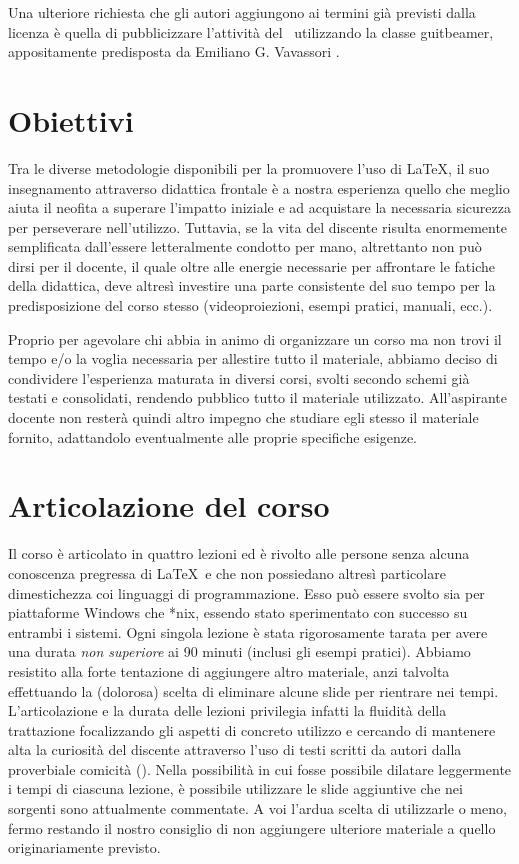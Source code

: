 \documentclass[a4paper,12pt]{article}
\begin{document}
Una ulteriore richiesta che gli autori aggiungono ai termini gi\`a
previsti dalla licenza \`e quella di pubblicizzare l'attivit\`a del
\GuITtext\ utilizzando la classe \textsf{guitbeamer}, appositamente
predisposta da Emiliano G. Vavassori \cite{EVG}.
\section{Obiettivi}
Tra le diverse metodologie disponibili per la promuovere l'uso di
\LaTeX, il suo insegnamento attraverso didattica frontale \`e a nostra
esperienza quello che meglio aiuta il neofita a superare l'impatto
iniziale e ad acquistare la necessaria sicurezza per perseverare
nell'utilizzo. Tuttavia, se la vita del discente risulta enormemente
semplificata dall'essere letteralmente condotto per mano,  altrettanto
non pu\`o dirsi per il docente, il quale oltre alle energie necessarie
per affrontare le fatiche della didattica, deve altres\`i investire
una parte consistente del suo tempo per  la predisposizione del corso
stesso (videoproiezioni, esempi pratici, manuali, ecc.).

Proprio per agevolare chi abbia in animo di organizzare un corso ma
non trovi il tempo e/o la voglia necessaria per allestire tutto il
materiale, abbiamo deciso di condividere l'esperienza maturata in
diversi corsi, svolti secondo schemi gi\`a testati e consolidati,
rendendo pubblico tutto il materiale utilizzato. All'aspirante docente
non rester\`a quindi altro impegno che studiare egli stesso il
materiale fornito, adattandolo eventualmente alle proprie specifiche
esigenze.

\section{Articolazione del corso}

Il corso \`e articolato in quattro lezioni ed \`e rivolto alle persone
senza alcuna conoscenza pregressa di \LaTeX\ e che non possiedano
altres\`i particolare dimestichezza coi linguaggi di programmazione.
Esso pu\`o essere svolto sia per piattaforme Windows che *nix, essendo
stato sperimentato con successo su entrambi i sistemi. Ogni singola
lezione \`e stata rigorosamente tarata per avere una durata
\textit{non superiore} ai 90 minuti (inclusi gli esempi pratici).
Abbiamo resistito alla forte tentazione di aggiungere altro materiale,
anzi talvolta effettuando la (dolorosa) scelta di eliminare alcune
slide per rientrare nei tempi. L'articolazione e la durata delle
lezioni privilegia infatti la fluidit\`a della trattazione
focalizzando gli aspetti di concreto utilizzo e cercando di mantenere
alta la curiosit\`a del discente attraverso l'uso di testi scritti da
autori dalla proverbiale comicit\`a (\cite{BNN,ALL,JKJ}). Nella
possibilit\`a in cui fosse possibile dilatare leggermente i tempi di
ciascuna lezione, \`e possibile utilizzare le slide aggiuntive che nei
sorgenti sono attualmente commentate. A voi l'ardua scelta di
utilizzarle o meno, fermo restando il nostro consiglio di non
aggiungere ulteriore materiale a quello originariamente previsto. 
\end{document}
